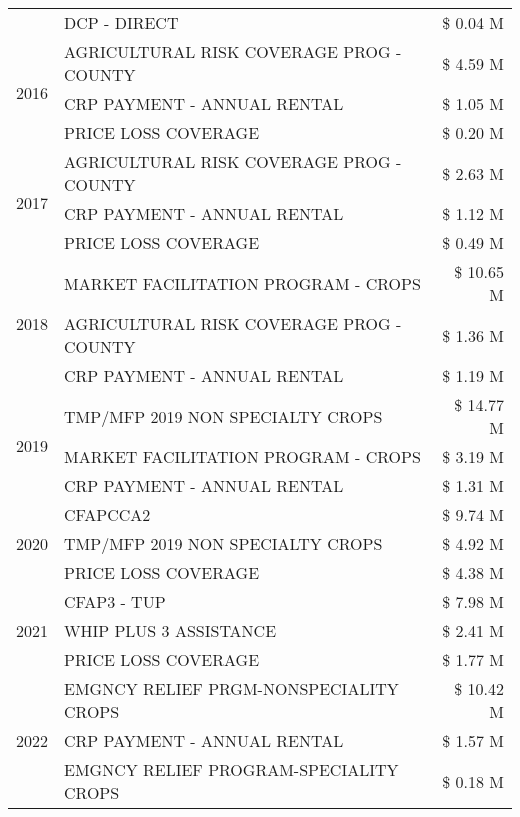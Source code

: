 \begin{tabular}{llr}
 & DCP - DIRECT & \$ 0.04 M \\
\cline{1-3}
\multirow[t]{3}{*}{2016} & AGRICULTURAL RISK COVERAGE PROG - COUNTY & \$ 4.59 M \\
 & CRP PAYMENT - ANNUAL RENTAL & \$ 1.05 M \\
 & PRICE LOSS COVERAGE & \$ 0.20 M \\
\cline{1-3}
\multirow[t]{3}{*}{2017} & AGRICULTURAL RISK COVERAGE PROG - COUNTY & \$ 2.63 M \\
 & CRP PAYMENT - ANNUAL RENTAL & \$ 1.12 M \\
 & PRICE LOSS COVERAGE & \$ 0.49 M \\
\cline{1-3}
\multirow[t]{3}{*}{2018} & MARKET FACILITATION PROGRAM - CROPS & \$ 10.65 M \\
 & AGRICULTURAL RISK COVERAGE PROG - COUNTY & \$ 1.36 M \\
 & CRP PAYMENT - ANNUAL RENTAL & \$ 1.19 M \\
\cline{1-3}
\multirow[t]{3}{*}{2019} & TMP/MFP 2019 NON SPECIALTY CROPS & \$ 14.77 M \\
 & MARKET FACILITATION PROGRAM - CROPS & \$ 3.19 M \\
 & CRP PAYMENT - ANNUAL RENTAL & \$ 1.31 M \\
\cline{1-3}
\multirow[t]{3}{*}{2020} & CFAPCCA2 & \$ 9.74 M \\
 & TMP/MFP 2019 NON SPECIALTY CROPS & \$ 4.92 M \\
 & PRICE LOSS COVERAGE & \$ 4.38 M \\
\cline{1-3}
\multirow[t]{3}{*}{2021} & CFAP3 - TUP & \$ 7.98 M \\
 & WHIP PLUS 3 ASSISTANCE & \$ 2.41 M \\
 & PRICE LOSS COVERAGE & \$ 1.77 M \\
\cline{1-3}
\multirow[t]{3}{*}{2022} & EMGNCY RELIEF PRGM-NONSPECIALITY CROPS & \$ 10.42 M \\
 & CRP PAYMENT - ANNUAL RENTAL & \$ 1.57 M \\
 & EMGNCY RELIEF PROGRAM-SPECIALITY CROPS & \$ 0.18 M \\
\cline{1-3}
\bottomrule
\end{tabular}
